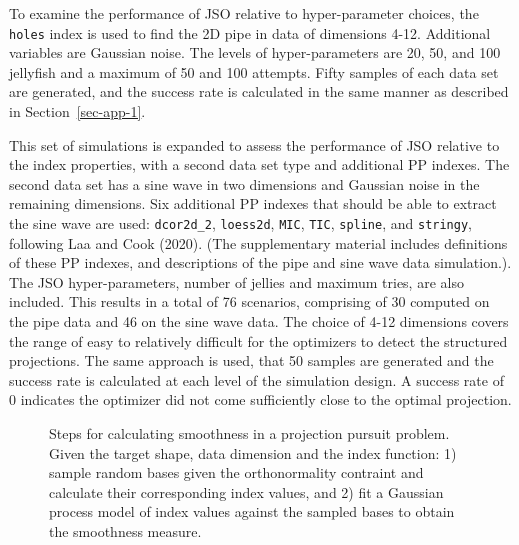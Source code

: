 \documentclass[
  12pt,
]{interact}
\theoremstyle{plain}
\begin{document}
To examine the performance of JSO relative to hyper-parameter choices,
the \texttt{holes} index is used to find the 2D pipe in data of
dimensions 4-12. Additional variables are Gaussian noise. The levels of
hyper-parameters are 20, 50, and 100 jellyfish and a maximum of 50 and
100 attempts. Fifty samples of each data set are generated, and the
success rate is calculated in the same manner as described in
Section~\ref{sec-app-1}.

This set of simulations is expanded to assess the performance of JSO
relative to the index properties, with a second data set type and
additional PP indexes. The second data set has a sine wave in two
dimensions and Gaussian noise in the remaining dimensions. Six
additional PP indexes that should be able to extract the sine wave are
used: \texttt{dcor2d\_2}, \texttt{loess2d}, \texttt{MIC}, \texttt{TIC},
\texttt{spline}, and \texttt{stringy}, following Laa and Cook (2020).
(The supplementary material includes definitions of these PP indexes,
and descriptions of the pipe and sine wave data simulation.). The JSO
hyper-parameters, number of jellies and maximum tries, are also
included. This results in a total of 76 scenarios, comprising of 30
computed on the pipe data and 46 on the sine wave data. The choice of
4-12 dimensions covers the range of easy to relatively difficult for the
optimizers to detect the structured projections. The same approach is
used, that 50 samples are generated and the success rate is calculated
at each level of the simulation design. A success rate of 0 indicates
the optimizer did not come sufficiently close to the optimal projection.

\begin{figure}


\caption{\label{fig-smoothness}Steps for calculating smoothness in a
projection pursuit problem. Given the target shape, data dimension and
the index function: 1) sample random bases given the orthonormality
contraint and calculate their corresponding index values, and 2) fit a
Gaussian process model of index values against the sampled bases to
obtain the smoothness measure.}

\end{figure}%
\end{document}
